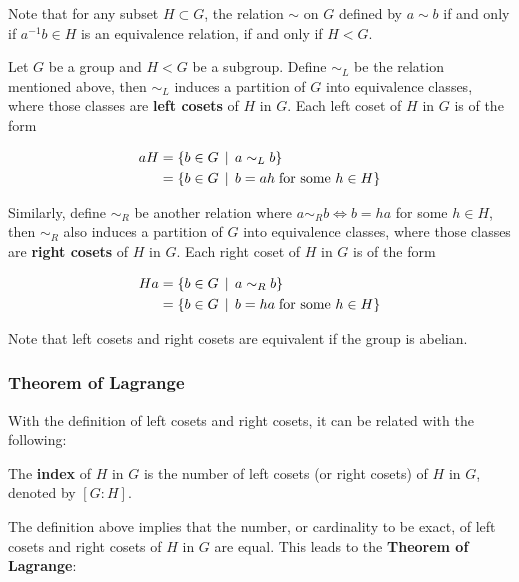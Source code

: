 \documentclass[a4paper,12pt]{article}
\begin{document}
Note that for any subset $H\subset G$, the relation $\sim$ on $G$ defined by $a\sim b$ if and only if $a^{-1}b\in H$ is an equivalence relation, if and only if $H<G$.

\begin{dft}
  Let $G$ be a group and $H<G$ be a subgroup. Define $\sim_{L}$ be the relation mentioned above, then $\sim_{L}$ induces a partition of $G$ into equivalence classes, where those classes are \textbf{left cosets} of $H$ in $G$. Each left coset of $H$ in $G$ is of the form

  $$\begin{aligned}[t]
    aH&=\left\{ b\in G\,\mid\, a\sim_{L}b\right\}\\
    &=\left\{ b\in G\,\mid\, b=ah\;\text{for some }h\in H\right\}
  \end{aligned}$$\s

  Similarly, define $\sim_{R}$ be another relation where $a\sim_{R}b\Leftrightarrow b=ha$ for some $h\in H$, then $\sim_{R}$ also induces a partition of $G$ into equivalence classes, where those classes are \textbf{right cosets} of $H$ in $G$. Each right coset of $H$ in $G$ is of the form

  $$\begin{aligned}[t]
    Ha&=\left\{ b\in G\,\mid\, a\sim_{R}b\right\}\\
    &=\left\{ b\in G\,\mid\, b=ha\;\text{for some }h\in H\right\}
  \end{aligned}$$
\end{dft}\n

Note that left cosets and right cosets are equivalent if the group is abelian.

\subsubsection{Theorem of Lagrange}
With the definition of left cosets and right cosets, it can be related with the following:\n

\begin{dft}
  The \textbf{index} of $H$ in $G$ is the number of left cosets (or right cosets) of $H$ in $G$, denoted by $[G:H]$.
\end{dft}\n

The definition above implies that the number, or cardinality to be exact, of left cosets and right cosets of $H$ in $G$ are equal. This leads to the \textbf{Theorem of Lagrange}:\n
\end{document}
